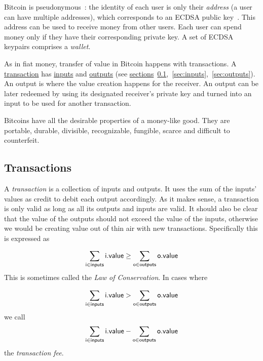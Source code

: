 Bitcoin is pseudonymous~\cite{gtklocker}: the identity of each user is only their \emph{address} (a user can have multiple addresses), which corresponds to an ECDSA public key~\cite{ecdsa}. This address can be used to receive money from other users. Each user can spend money only if they have their corresponding private key. A set of ECDSA keypairs comprises a \emph{wallet}.

As in fiat money, transfer of value in Bitcoin happens with transactions. A \hyperref[sec:transactions]{transaction} has \hyperref[sec:inputs]{inputs} and \hyperref[sec:outputs]{outputs} (see \hyperref[sec:outputs]{sections}~\ref{sec:transactions},~\ref{sec:inputs},~\ref{sec:outputs}). An output is where the value creation happens for the receiver. An output can be later redeemed by using its designated receiver's private key and turned into an input to be used for another transaction.

Bitcoins have all the desirable properties of a money-like good. They are portable, durable, divisible, recognizable, fungible, scarce and difficult to counterfeit.

\subsection{Transactions} \label{sec:transactions}
A \emph{transaction} is a collection of inputs and outputs. It uses the sum of the inputs' values as credit to debit each output accordingly. As it makes sense, a transaction is only valid as long as all its outputs and inputs are valid. It should also be clear that the value of the outputs should not exceed the value of the inputs, otherwise we would be creating value out of thin air with new transactions. Specifically this is expressed as

\begin{equation} \nonumber
  \sum_{\sf i \in inputs} {\sf i.value} \ge \sum_{\sf o \in outputs} {\sf o.value}
\end{equation}
This is sometimes called the \emph{Law of Conservation}. In cases where

\begin{equation} \nonumber
  \sum_{\sf i \in inputs} {\sf i.value} > \sum_{\sf o \in outputs} {\sf o.value}
\end{equation}
we call
\begin{equation} \nonumber
  \sum_{\sf i \in inputs} {\sf i.value} - \sum_{\sf o \in outputs} {\sf o.value}
\end{equation}
the \emph{transaction fee}.

